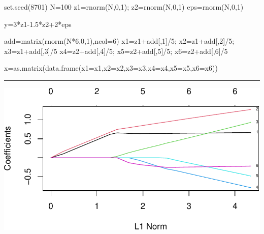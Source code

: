 \documentclass[
  letterpaper,
  DIV=11,
  numbers=noendperiod]{scrartcl}
\newenvironment{Shaded}{\begin{snugshade}}{\end{snugshade}}
\newcommand{\AttributeTok}[1]{\textcolor[rgb]{0.40,0.45,0.13}{#1}}
\newcommand{\DecValTok}[1]{\textcolor[rgb]{0.68,0.00,0.00}{#1}}
\newcommand{\FloatTok}[1]{\textcolor[rgb]{0.68,0.00,0.00}{#1}}
\newcommand{\FunctionTok}[1]{\textcolor[rgb]{0.28,0.35,0.67}{#1}}
\newcommand{\NormalTok}[1]{\textcolor[rgb]{0.00,0.23,0.31}{#1}}
\newcommand{\OtherTok}[1]{\textcolor[rgb]{0.00,0.23,0.31}{#1}}
\newcommand{\SpecialCharTok}[1]{\textcolor[rgb]{0.37,0.37,0.37}{#1}}
\begin{document}
\begin{Shaded}
\begin{Highlighting}[]
\FunctionTok{set.seed}\NormalTok{(}\DecValTok{8701}\NormalTok{)}
\NormalTok{N}\OtherTok{=}\DecValTok{100}
\NormalTok{z1}\OtherTok{=}\FunctionTok{rnorm}\NormalTok{(N,}\DecValTok{0}\NormalTok{,}\DecValTok{1}\NormalTok{); z2}\OtherTok{=}\FunctionTok{rnorm}\NormalTok{(N,}\DecValTok{0}\NormalTok{,}\DecValTok{1}\NormalTok{)}
\NormalTok{eps}\OtherTok{=}\FunctionTok{rnorm}\NormalTok{(N,}\DecValTok{0}\NormalTok{,}\DecValTok{1}\NormalTok{)}

\NormalTok{y}\OtherTok{=}\DecValTok{3}\SpecialCharTok{*}\NormalTok{z1}\FloatTok{{-}1.5}\SpecialCharTok{*}\NormalTok{z2}\SpecialCharTok{+}\DecValTok{2}\SpecialCharTok{*}\NormalTok{eps}

\NormalTok{add}\OtherTok{=}\FunctionTok{matrix}\NormalTok{(}\FunctionTok{rnorm}\NormalTok{(N}\SpecialCharTok{*}\DecValTok{6}\NormalTok{,}\DecValTok{0}\NormalTok{,}\DecValTok{1}\NormalTok{),}\AttributeTok{ncol=}\DecValTok{6}\NormalTok{)}
\NormalTok{x1}\OtherTok{=}\NormalTok{z1}\SpecialCharTok{+}\NormalTok{add[,}\DecValTok{1}\NormalTok{]}\SpecialCharTok{/}\DecValTok{5}\NormalTok{; x2}\OtherTok{=}\NormalTok{z1}\SpecialCharTok{+}\NormalTok{add[,}\DecValTok{2}\NormalTok{]}\SpecialCharTok{/}\DecValTok{5}\NormalTok{; x3}\OtherTok{=}\NormalTok{z1}\SpecialCharTok{+}\NormalTok{add[,}\DecValTok{3}\NormalTok{]}\SpecialCharTok{/}\DecValTok{5}
\NormalTok{x4}\OtherTok{=}\NormalTok{z2}\SpecialCharTok{+}\NormalTok{add[,}\DecValTok{4}\NormalTok{]}\SpecialCharTok{/}\DecValTok{5}\NormalTok{; x5}\OtherTok{=}\NormalTok{z2}\SpecialCharTok{+}\NormalTok{add[,}\DecValTok{5}\NormalTok{]}\SpecialCharTok{/}\DecValTok{5}\NormalTok{; x6}\OtherTok{=}\NormalTok{z2}\SpecialCharTok{+}\NormalTok{add[,}\DecValTok{6}\NormalTok{]}\SpecialCharTok{/}\DecValTok{5}

\NormalTok{x}\OtherTok{=}\FunctionTok{as.matrix}\NormalTok{(}\FunctionTok{data.frame}\NormalTok{(}\AttributeTok{x1=}\NormalTok{x1,}\AttributeTok{x2=}\NormalTok{x2,}\AttributeTok{x3=}\NormalTok{x3,}\AttributeTok{x4=}\NormalTok{x4,}\AttributeTok{x5=}\NormalTok{x5,}\AttributeTok{x6=}\NormalTok{x6))}
\end{Highlighting}
\end{Shaded}

\begin{center}\rule{0.5\linewidth}{0.5pt}\end{center}

\includegraphics{L9_files/figure-pdf/unnamed-chunk-7-1.pdf}
\end{document}
